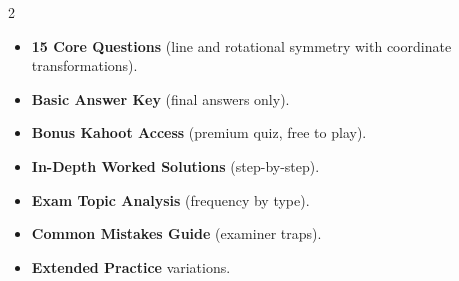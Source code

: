 \documentclass[11pt,a4paper]{article}
\newcommand{\FullReleaseDate}{April 30, 2026}
\begin{document}
\vspace{8pt}

\begin{multicols}{2}
  \begin{tcolorbox}[card, title=\sffamily\bfseries\textcolor{white}{\faHandPointDown\ TODAY (Simplified Version)}, colbacktitle=mainblue, boxed title style={sharp corners, boxrule=0pt}]
    \begin{itemize}[leftmargin=1.2em, itemsep=2pt]
      \item \small \textbf{15 Core Questions} (line and rotational symmetry with coordinate transformations).
      \item \small \textbf{Basic Answer Key} (final answers only).
      \item \small \textbf{Bonus Kahoot Access} (premium quiz, free to play).
    \end{itemize}
  \end{tcolorbox}

  \columnbreak

  \begin{tcolorbox}[card, title=\sffamily\bfseries\textcolor{white}{\faRocket\ ON \FullReleaseDate\ (Full Upgrade)}, colbacktitle=mainblue, boxed title style={sharp corners, boxrule=0pt}]
    \begin{itemize}[leftmargin=1.2em, itemsep=2pt]
      \item \small \textbf{In-Depth Worked Solutions} (step-by-step).
      \item \small \textbf{Exam Topic Analysis} (frequency by type).
      \item \small \textbf{Common Mistakes Guide} (examiner traps).
      \item \small \textbf{Extended Practice} variations.
    \end{itemize}
  \end{tcolorbox}
\end{multicols}
\end{document}
